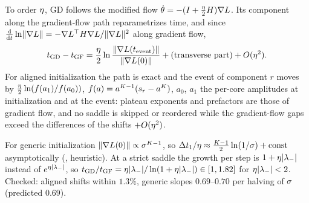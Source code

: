\begin{proposition}\label{prop:A-gd-shift}
  \derived{} 
  To order $\eta$, GD follows the modified flow $\dot{\theta}=-(I+\frac{\eta}2H)\nabla L$. Its component along the
  gradient-flow path reparametrizes time, and since $\frac{\mathrm{d}}{\mathrm{d} t}\ln\lVert\nabla L\rVert=-\nabla L^{\top}H\nabla L/\lVert\nabla L\rVert^2$ along
  gradient flow,
  \begin{equation}\label{eq:A-gd-shift}
    t_{\rm GD}-t_{\rm GF}=\frac{\eta}2\ln\frac{\lVert\nabla L(t_{\rm event})\rVert}{\lVert\nabla L(0)\rVert}
    +(\text{transverse part})+O(\eta^2).
  \end{equation}
  For aligned initialization the path is exact and the event of component $r$ moves by $\frac{\eta}2\ln(f(a_1)/f(a_0))$,
  $f(a)=a^{K-1}(s_{r}-a^K)$, $a_0$, $a_1$ the per-core amplitudes at initialization and at the event: plateau
  exponents and prefactors are those of gradient flow, and no saddle is skipped or reordered while the
  gradient-flow gaps exceed the differences of the shifts $+O(\eta^2)$.
\end{proposition}
For generic initialization $\lVert\nabla L(0)\rVert\propto\sigma^{K-1}$, so $\Delta t_{1}/\eta\approx\frac{K-1}2\ln(1/\sigma)+{\rm const}$
asymptotically (\conjecture, heuristic). At a strict saddle the growth per step is $1+\eta\lvert\lambda_-\rvert$ instead
of $e^{\eta\lvert\lambda_-\rvert}$, so $t_{\rm GD}/t_{\rm GF}=\eta\lvert\lambda_-\rvert/\ln(1+\eta\lvert\lambda_-\rvert)\in[1,1.82]$ for $\eta\lvert\lambda_-\rvert<2$. Checked: aligned
shifts within $1.3\%$, generic slopes $0.69$--$0.70$ per halving of $\sigma$ (predicted $0.69$).

